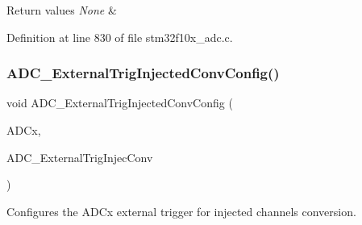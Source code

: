 \begin{DoxyRetVals}{Return values}
{\em None} & \\
\hline
\end{DoxyRetVals}


Definition at line 830 of file stm32f10x\+\_\+adc.\+c.

\mbox{\label{group___a_d_c___exported___functions_gafc02ce1e84e96b692adf085f61a0bca6}} 
\subsubsection{\texorpdfstring{A\+D\+C\+\_\+\+External\+Trig\+Injected\+Conv\+Config()}{ADC\_ExternalTrigInjectedConvConfig()}}
{\footnotesize\ttfamily void A\+D\+C\+\_\+\+External\+Trig\+Injected\+Conv\+Config (\begin{DoxyParamCaption}\item[{\hyperlink{struct_a_d_c___type_def}{A\+D\+C\+\_\+\+Type\+Def} $\ast$}]{A\+D\+Cx,  }\item[{uint32\+\_\+t}]{A\+D\+C\+\_\+\+External\+Trig\+Injec\+Conv }\end{DoxyParamCaption})}



Configures the A\+D\+Cx external trigger for injected channels conversion. 


